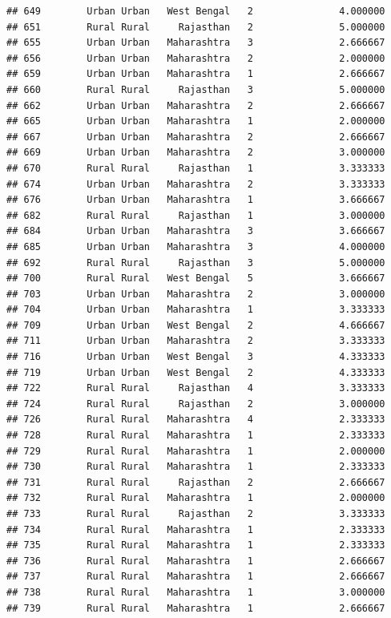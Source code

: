 \documentclass[
]{article}
\begin{document}
\begin{verbatim}
## 649        Urban Urban   West Bengal   2               4.000000
## 651        Rural Rural     Rajasthan   2               5.000000
## 655        Urban Urban   Maharashtra   3               2.666667
## 656        Urban Urban   Maharashtra   2               2.000000
## 659        Urban Urban   Maharashtra   1               2.666667
## 660        Rural Rural     Rajasthan   3               5.000000
## 662        Urban Urban   Maharashtra   2               2.666667
## 665        Urban Urban   Maharashtra   1               2.000000
## 667        Urban Urban   Maharashtra   2               2.666667
## 669        Urban Urban   Maharashtra   2               3.000000
## 670        Rural Rural     Rajasthan   1               3.333333
## 674        Urban Urban   Maharashtra   2               3.333333
## 676        Urban Urban   Maharashtra   1               3.666667
## 682        Rural Rural     Rajasthan   1               3.000000
## 684        Urban Urban   Maharashtra   3               3.666667
## 685        Urban Urban   Maharashtra   3               4.000000
## 692        Rural Rural     Rajasthan   3               5.000000
## 700        Rural Rural   West Bengal   5               3.666667
## 703        Urban Urban   Maharashtra   2               3.000000
## 704        Urban Urban   Maharashtra   1               3.333333
## 709        Urban Urban   West Bengal   2               4.666667
## 711        Urban Urban   Maharashtra   2               3.333333
## 716        Urban Urban   West Bengal   3               4.333333
## 719        Urban Urban   West Bengal   2               4.333333
## 722        Rural Rural     Rajasthan   4               3.333333
## 724        Rural Rural     Rajasthan   2               3.000000
## 726        Rural Rural   Maharashtra   4               2.333333
## 728        Rural Rural   Maharashtra   1               2.333333
## 729        Rural Rural   Maharashtra   1               2.000000
## 730        Rural Rural   Maharashtra   1               2.333333
## 731        Rural Rural     Rajasthan   2               2.666667
## 732        Rural Rural   Maharashtra   1               2.000000
## 733        Rural Rural     Rajasthan   2               3.333333
## 734        Rural Rural   Maharashtra   1               2.333333
## 735        Rural Rural   Maharashtra   1               2.333333
## 736        Rural Rural   Maharashtra   1               2.666667
## 737        Rural Rural   Maharashtra   1               2.666667
## 738        Rural Rural   Maharashtra   1               3.000000
## 739        Rural Rural   Maharashtra   1               2.666667

\end{verbatim}
\end{document}
